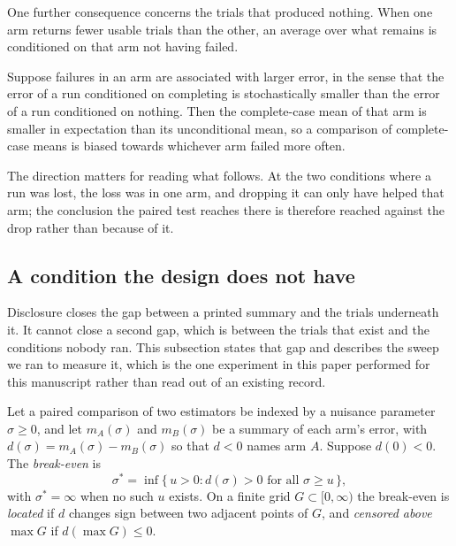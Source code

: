 One further consequence concerns the trials that produced nothing. When one arm
returns fewer usable trials than the other, an average over what remains is
conditioned on that arm not having failed.

\begin{corollary}\label{cor:completecase}
Suppose failures in an arm are associated with larger error, in the sense that
the error of a run conditioned on completing is stochastically smaller than the
error of a run conditioned on nothing. Then the complete-case mean of that arm
is smaller in expectation than its unconditional mean, so a comparison of
complete-case means is biased towards whichever arm failed more often.
\end{corollary}

The direction matters for reading what follows. At the two conditions where a
run was lost, the loss was in one arm, and dropping it can only have helped that
arm; the conclusion the paired test reaches there is therefore reached against
the drop rather than because of it.

\subsection{A condition the design does not have}

Disclosure closes the gap between a printed summary and the trials underneath
it. It cannot close a second gap, which is between the trials that exist and the
conditions nobody ran. This subsection states that gap and describes the sweep
we ran to measure it, which is the one experiment in this paper performed for
this manuscript rather than read out of an existing record.

\begin{definition}\label{def:breakeven}
Let a paired comparison of two estimators be indexed by a nuisance parameter
$\sigma \ge 0$, and let $m_A(\sigma)$ and $m_B(\sigma)$ be a summary of each
arm's error, with $d(\sigma) = m_A(\sigma) - m_B(\sigma)$ so that $d < 0$ names
arm $A$. Suppose $d(0) < 0$. The \emph{break-even} is
\[
  \sigma^\ast = \inf\{\, u > 0 : d(\sigma) > 0 \text{ for all } \sigma \ge u \,\},
\]
with $\sigma^\ast = \infty$ when no such $u$ exists. On a finite grid
$G \subset [0,\infty)$ the break-even is \emph{located} if $d$ changes sign
between two adjacent points of $G$, and \emph{censored above} $\max G$ if
$d(\max G) \le 0$.
\end{definition}

